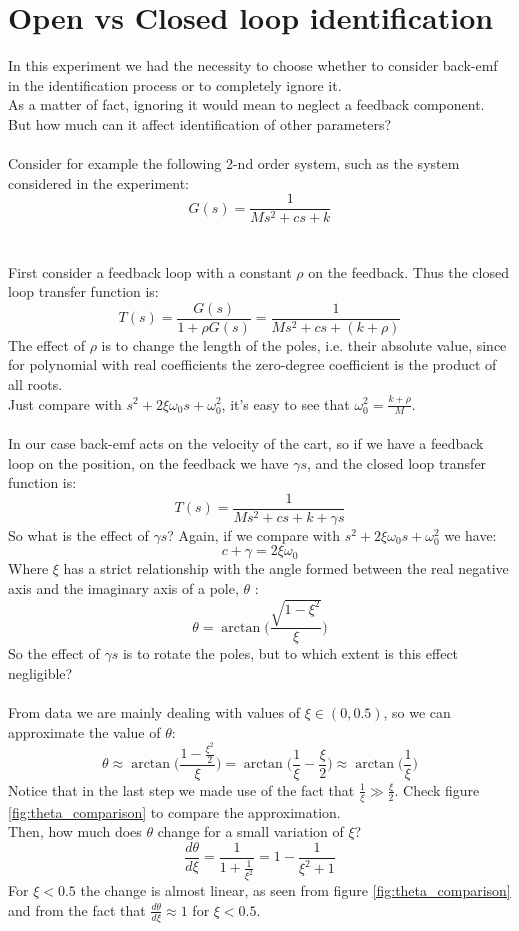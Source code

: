 \section{Open vs Closed loop identification}
In this experiment we had the necessity to choose whether to consider back-emf in the identification process or to completely ignore it. \\
As a matter of fact, ignoring it would mean to neglect a feedback component. But how much can it affect identification of other parameters?
\\ \\
Consider for example the following 2-nd order system, such as the system considered in the experiment:
$$G(s) = \frac{1}{Ms^2+cs+k}$$
\\ \\
First consider a feedback loop with a constant $\rho$ on the feedback. Thus the closed loop transfer function is:
$$T(s) = \frac{G(s)}{1+\rho G(s)} = \frac{1}{Ms^2+cs+(k+\rho )}$$
The effect of $\rho$ is to change the length of the poles, i.e. their absolute value, since for polynomial with real coefficients the zero-degree coefficient is the product of all roots. \\
Just compare with $s^2+2\xi \omega_0 s+ \omega_0^2$, it's easy to see that $\omega_0^2 = \frac{k+\rho}{M}$.
\\\ \\
In our case  back-emf acts on the velocity of the cart, so if we have a feedback loop on the position, on the feedback we have  $\gamma s$, and the  closed loop transfer function is:
$$T(s) = \frac{1}{Ms^2+cs+k+\gamma s}$$
So what is the effect of $\gamma s$?
Again, if we compare with $s^2+2\xi \omega_0 s+ \omega_0^2$ we have:
$$c+\gamma = 2\xi \omega_0$$
Where $\xi$ has a strict relationship with the angle formed between the real negative axis and the imaginary axis of a pole,  $\theta$ :
$$\theta = \arctan \Big(\frac{\sqrt{1-\xi^2}}{\xi} \Big)$$
So the effect of $\gamma s$ is to rotate the poles, but to which extent is this effect negligible? \\ \\
From data we are mainly dealing with values of $\xi \in (0, 0.5)$, so we can approximate the value of $\theta$:
$$\theta \approx \arctan \Big(\frac{1-\frac{\xi^2}{2}}{\xi} \Big) = \arctan \Big(\frac{1}{\xi}-\frac{\xi}{2} \Big) \approx \arctan \Big (\frac{1}{\xi} \Big)$$
Notice that in the last step we made use of the fact that $\frac{1}{\xi} \gg \frac{\xi}{2}$. Check figure \ref{fig:theta_comparison} to compare the approximation. \\ 
Then, how much does $\theta$ change for a small variation of $\xi$?
$$\frac{d\theta}{d\xi} = \frac{1}{1+\frac{1}{\xi^2}} = 1- \frac{1}{\xi^2+1}$$
For $\xi < 0.5$ the change is almost linear, as seen from figure \ref{fig:theta_comparison} and from the fact that $\frac{d\theta}{d\xi} \approx 1$ for $\xi < 0.5$.

